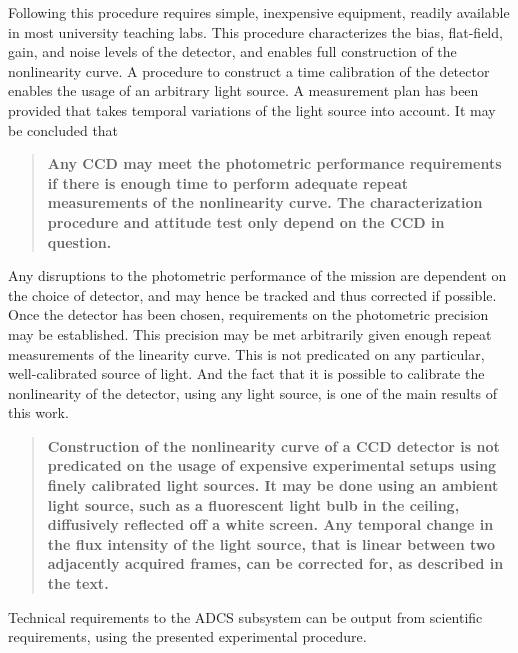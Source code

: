 \documentclass[../main.tex]{subfiles}
\begin{document}
\noindent Following this procedure requires simple, inexpensive equipment, readily available in most university teaching labs. This procedure characterizes the bias, flat-field, gain, and noise levels of the detector, and enables full construction of the nonlinearity curve. A procedure to construct a time calibration of the detector enables the usage of an arbitrary light source. A measurement plan has been provided that takes temporal variations of the light source into account. It may be concluded that

\begin{tcolorbox}[colframe = white, sharpish corners]
	\begin{quote}
		\textbf{Any CCD may meet the photometric performance requirements if there is enough time to perform adequate repeat measurements of the nonlinearity curve. The characterization procedure and attitude test only depend on the CCD in question.}
	\end{quote}
\end{tcolorbox}

\noindent Any disruptions to the photometric performance of the mission are dependent on the choice of detector, and may hence be tracked and thus corrected if possible. Once the detector has been chosen, requirements on the photometric precision may be established. This precision may be met arbitrarily given enough repeat measurements of the linearity curve. This is not predicated on any particular, well-calibrated source of light. And the fact that it is possible to calibrate the nonlinearity of the detector, using any light source, is one of the main results of this work. 

\begin{tcolorbox}[colframe = white, sharpish corners]
	\begin{quote}
		\textbf{Construction of the nonlinearity curve of a CCD detector is not predicated on the usage of expensive experimental setups using finely calibrated light sources. It may be done using an ambient light source, such as a fluorescent light bulb in the ceiling, diffusively reflected off a white screen. Any temporal change in the flux intensity of the light source, that is linear between two adjacently acquired frames, can be corrected for, as described in the text.}
	\end{quote}
\end{tcolorbox}

\noindent Technical requirements to the ADCS subsystem can be output from scientific requirements, using the presented experimental procedure.
\end{document}

